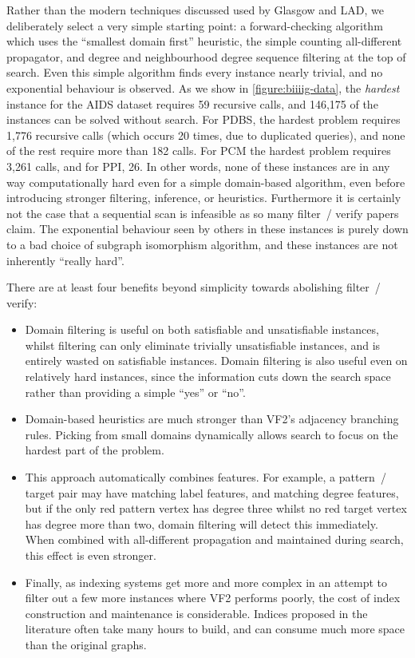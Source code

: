 \documentclass[twoside,11pt]{article}
\begin{document}
Rather than the modern techniques discussed used by Glasgow and LAD, we deliberately select a very
simple starting point: a forward-checking algorithm which uses the ``smallest domain first''
heuristic, the simple counting all-different propagator, and degree and neighbourhood degree
sequence filtering at the top of search. Even this simple algorithm finds every instance nearly
trivial, and no exponential behaviour is observed. As we show in \cref{figure:biiiig-data}, the
\emph{hardest} instance for the AIDS dataset requires 59 recursive calls, and 146,175 of the
instances can be solved without search.  For PDBS, the hardest problem requires 1,776 recursive
calls (which occurs 20 times, due to duplicated queries), and none of the rest require more than 182
calls. For PCM the hardest problem requires 3,261 calls, and for PPI, 26. In other words, none of
these instances are in any way computationally hard even for a simple domain-based algorithm, even
before introducing stronger filtering, inference, or heuristics. Furthermore it is certainly not the
case that a sequential scan is infeasible as so many filter~/ verify papers claim.  The exponential
behaviour seen by others in these instances is purely down to a bad choice of subgraph isomorphism
algorithm, and these instances are not inherently ``really hard''.

There are at least four benefits beyond simplicity towards abolishing filter~/ verify:

\begin{itemize}
    \item Domain filtering is useful on both satisfiable and unsatisfiable instances, whilst
        filtering can only eliminate trivially unsatisfiable instances, and is entirely wasted on
        satisfiable instances. Domain filtering is also useful even on relatively hard instances,
        since the information cuts down the search space rather than providing a simple ``yes'' or
        ``no''.

    \item Domain-based heuristics are much stronger than VF2's adjacency branching rules. Picking
        from small domains dynamically allows search to focus on the hardest part of the problem.

    \item This approach automatically combines features. For example, a pattern~/ target pair may
        have matching label features, and matching degree features, but if the only red pattern
        vertex has degree three whilst no red target vertex has degree more than two, domain
        filtering will detect this immediately. When combined with all-different propagation and
        maintained during search, this effect is even stronger.

    \item Finally, as indexing systems get more and more complex in an attempt to filter out a few more
        instances where VF2 performs poorly, the cost of index construction and maintenance is
        considerable.  Indices proposed in the literature often take many hours to build, and can
        consume much more space than the original graphs.
\end{itemize}
\end{document}
